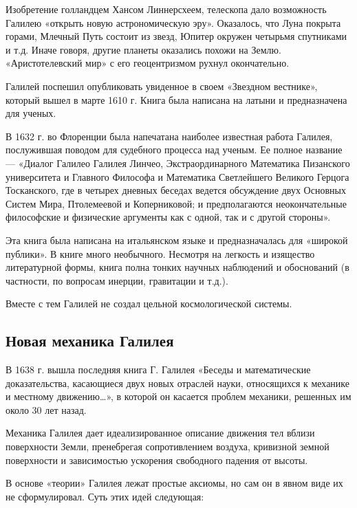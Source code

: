\documentclass[a4paper, 14pt]{extreport}
\begin{document}
Изобретение голландцем Хансом Линнерсхеем, телескопа дало возможность
Галилею «открыть новую астрономическую эру». Оказалось, что Луна покрыта
горами, Млечный Путь состоит из звезд, Юпитер окружен четырьмя
спутниками и т.д. Иначе говоря, другие планеты оказались похожи на
Землю. «Аристотелевский мир» с его геоцентризмом рухнул окончательно.

Галилей поспешил опубликовать увиденное в своем «Звездном вестнике»,
который вышел в марте 1610 г. Книга была написана на латыни и
предназначена для ученых.

В 1632 г. во Флоренции была напечатана наиболее известная работа
Галилея, послужившая поводом для судебного процесса над ученым. Ее
полное название --- «Диалог Галилео Галилея Линчео, Экстраординарного
Математика Пизанского университета и Главного Философа и Математика
Светлейшего Великого Герцога Тосканского, где в четырех дневных беседах
ведется обсуждение двух Основных Систем Мира, Птолемеевой и
Коперниковой; и предполагаются неокончательные философские и физические
аргументы как с одной, так и с другой стороны».

Эта книга была написана на итальянском языке и предназначалась для
«широкой публики». В книге много необычного. Несмотря на легкость и
изящество литературной формы, книга полна тонких научных наблюдений и
обоснований (в частности, по вопросам инерции, гравитации и т.д.).

Вместе с тем Галилей не создал цельной космологической системы.

\subsection{Новая механика Галилея}

В 1638 г. вышла последняя книга Г. Галилея «Беседы и математические
доказательства, касающиеся двух новых отраслей науки, относящихся к
механике и местному движению\ldots», в которой он касается проблем
механики, решенных им около 30 лет назад.

Механика Галилея дает идеализированное описание движения тел вблизи
поверхности Земли, пренебрегая сопротивлением воздуха, кривизной земной
поверхности и зависимостью ускорения свободного падения от высоты.

В основе «теории» Галилея лежат простые аксиомы, но сам он в явном виде
их не сформулировал. Суть этих идей следующая:
\end{document}
